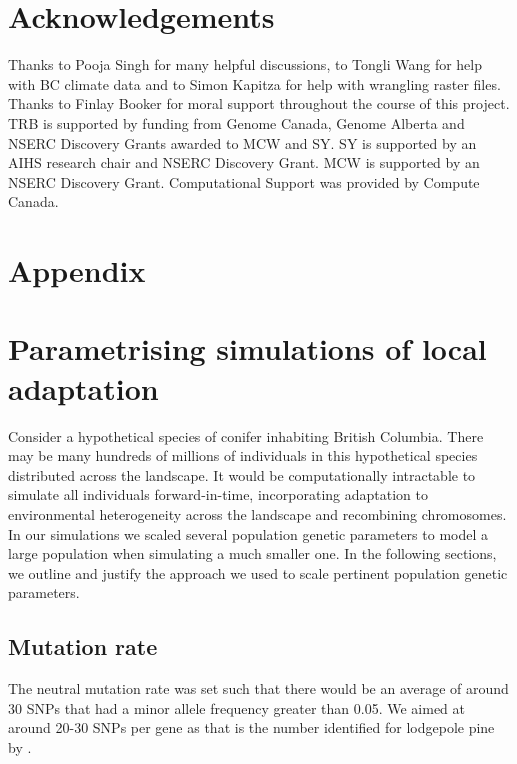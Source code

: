 \documentclass[10pt,twoside,lineno, twocolumn]{GSA_format}
\newcommand{\beginsupplement}{%
        \setcounter{table}{0}
        \renewcommand{\thetable}{S\arabic{table}}%
        \setcounter{figure}{0}        \renewcommand{\thefigure}{S\arabic{figure}}%
     }
\begin{document}
\section{Acknowledgements}

Thanks to Pooja Singh for many helpful discussions, to Tongli Wang for help with BC climate data and to Simon Kapitza for help with wrangling raster files. Thanks to Finlay Booker for moral support throughout the course of this project. TRB is supported by funding from Genome Canada, Genome Alberta and NSERC Discovery Grants awarded to MCW and SY. SY is supported by an AIHS research chair and NSERC Discovery Grant. MCW is supported by an NSERC Discovery Grant. Computational Support was provided by Compute Canada.\\



\beginsupplement
\onecolumn
\section{Appendix}

\section{Parametrising simulations of local adaptation}
Consider a hypothetical species of conifer inhabiting British Columbia. There may be many hundreds of millions of individuals in this hypothetical species distributed across the landscape. It would be computationally intractable to simulate all individuals forward-in-time, incorporating adaptation to environmental heterogeneity across the landscape and recombining chromosomes. In our simulations we scaled several population genetic parameters to model a large population when simulating a much smaller one. In the following sections, we outline and justify the approach we used to scale pertinent population genetic parameters. 

\subsection{Mutation rate} 
The neutral mutation rate was set such that there would be an average of around 30 SNPs that had  a minor allele frequency greater than 0.05. We aimed at around 20-30 SNPs per gene as that is the number identified for lodgepole pine by \cite{Yeaman2016}. 
\end{document}
